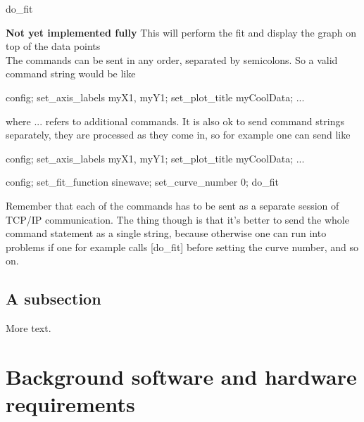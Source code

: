 \documentclass[11pt]{article} %
\begin{document}
\begin{tcolorbox}[title=Configuration command string (config)]
{\selectfont do\_fit}

\textbf{Not yet implemented fully}
This will perform the fit and display the graph on top of the data points
\\

The commands can be sent in any order, separated by semicolons. So a valid command string would be like 

{\selectfont config; set\_axis\_labels myX1, myY1; set\_plot\_title myCoolData; ... }

where ... refers to additional commands. It is also ok to send command strings separately, they are processed as they come in, so for example one can send like 

{\selectfont config; set\_axis\_labels myX1, myY1; set\_plot\_title myCoolData; ... }

{\selectfont config; set\_fit\_function sinewave; set\_curve\_number 0; do\_fit}

Remember that each of the commands has to be sent as a separate session of TCP/IP communication. The thing though is that it's better to send the whole command statement as a single string, because otherwise one can run into problems if one for example calls [do\_fit] before setting the curve number, and so on. 

\end{tcolorbox}



\subsection{A subsection}

More text.

\section{Background software and hardware requirements}
\end{document}
